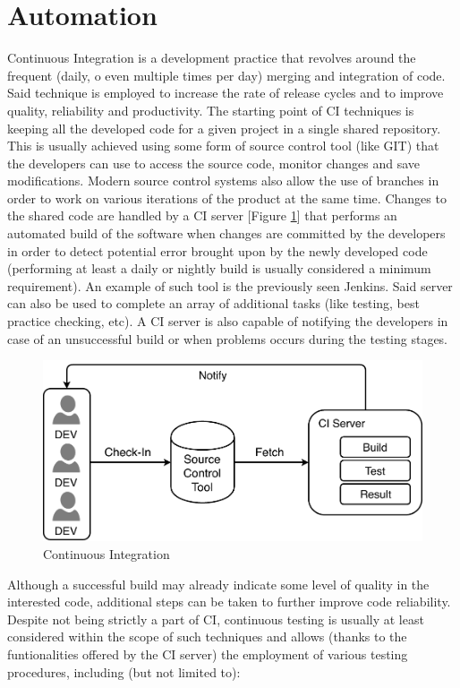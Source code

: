 \section{Automation}

Continuous Integration \cite{CI} is a development practice that revolves around the frequent (daily, o even multiple times per day) merging and integration of code. Said technique is employed to increase the rate of release cycles and to improve quality, reliability and productivity. The starting point of CI techniques is keeping all the developed code for a given project in a single shared repository. This is usually achieved using some form of source control tool (like GIT) that the developers can use to access the source code, monitor changes and save modifications. Modern source control systems also allow the use of branches in order to work on various iterations of the product at the same time. Changes to the shared code are handled by a CI server [Figure \ref{fig:CI}] that performs an automated build of the software when changes are committed by the developers in order to detect potential error brought upon by the newly developed code (performing at least a daily or nightly build is usually considered a minimum requirement). An example of such tool is the previously seen Jenkins. Said server can also be used to complete an array of additional tasks (like testing, best practice checking, etc). A CI server is also capable of notifying the developers in case of an unsuccessful build or when problems occurs during the testing stages.

\begin{figure}[ht]
	\centering
	\includegraphics[scale=0.7]{Images/CI.pdf}
	\caption{Continuous Integration}
	\label{fig:CI}
\end{figure}

Although a successful build may already indicate some level of quality in the interested code, additional steps can be taken to further improve code reliability. Despite not being strictly a part of CI, continuous testing \cite{CT} is usually at least considered within the scope of such techniques and allows (thanks to the funtionalities offered by the CI server) the employment of various testing procedures, including (but not limited to):

